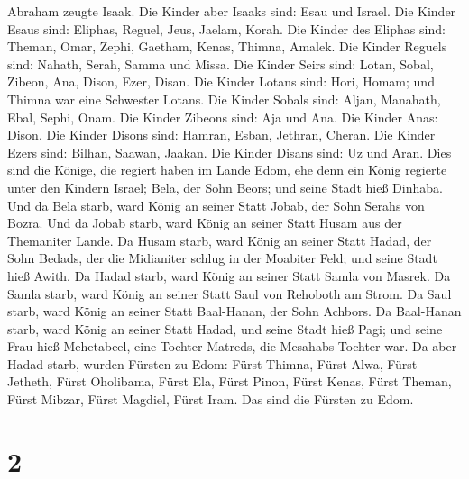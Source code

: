  Abraham zeugte Isaak. Die Kinder aber Isaaks sind: Esau
und Israel.  Die Kinder Esaus sind: Eliphas, Reguel,
Jeus, Jaelam, Korah.  Die Kinder des Eliphas sind:
Theman, Omar, Zephi, Gaetham, Kenas, Thimna, Amalek.  Die
Kinder Reguels sind: Nahath, Serah, Samma und Missa.  Die
Kinder Seirs sind: Lotan, Sobal, Zibeon, Ana, Dison, Ezer, Disan.
 Die Kinder Lotans sind: Hori, Homam; und Thimna war eine
Schwester Lotans.  Die Kinder Sobals sind: Aljan,
Manahath, Ebal, Sephi, Onam. Die Kinder Zibeons sind: Aja und Ana.
 Die Kinder Anas: Dison. Die Kinder Disons sind: Hamran,
Esban, Jethran, Cheran.  Die Kinder Ezers sind: Bilhan,
Saawan, Jaakan. Die Kinder Disans sind: Uz und Aran. 
Dies sind die Könige, die regiert haben im Lande Edom, ehe denn ein
König regierte unter den Kindern Israel; Bela, der Sohn Beors; und seine
Stadt hieß Dinhaba.  Und da Bela starb, ward König an
seiner Statt Jobab, der Sohn Serahs von Bozra.  Und da
Jobab starb, ward König an seiner Statt Husam aus der Themaniter Lande.
 Da Husam starb, ward König an seiner Statt Hadad, der
Sohn Bedads, der die Midianiter schlug in der Moabiter Feld; und seine
Stadt hieß Awith.  Da Hadad starb, ward König an seiner
Statt Samla von Masrek.  Da Samla starb, ward König an
seiner Statt Saul von Rehoboth am Strom.  Da Saul starb,
ward König an seiner Statt Baal-Hanan, der Sohn Achbors. 
Da Baal-Hanan starb, ward König an seiner Statt Hadad, und seine Stadt
hieß Pagi; und seine Frau hieß Mehetabeel, eine Tochter Matreds, die
Mesahabs Tochter war.  Da aber Hadad starb, wurden
Fürsten zu Edom: Fürst Thimna, Fürst Alwa, Fürst Jetheth,
 Fürst Oholibama, Fürst Ela, Fürst Pinon, 
Fürst Kenas, Fürst Theman, Fürst Mibzar,  Fürst Magdiel,
Fürst Iram. Das sind die Fürsten zu Edom.

\hypertarget{section-1}{%
\section{2}\label{section-1}}

